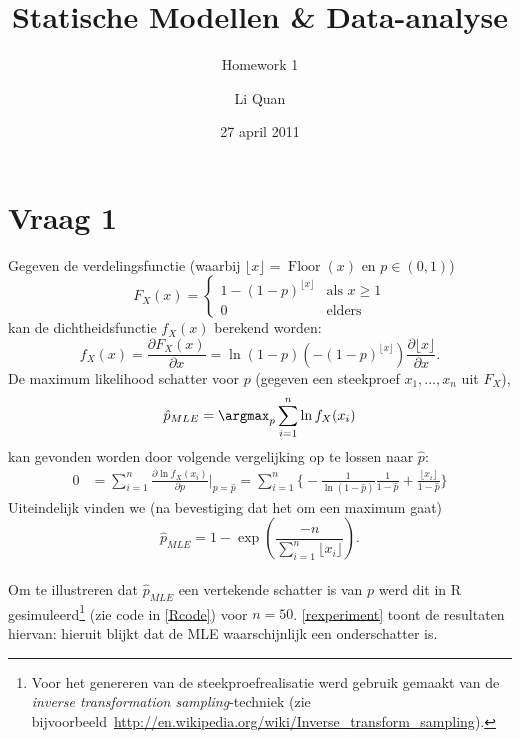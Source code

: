 \documentclass[a4paper,dutch,11pt,]{scrartcl}
\title{Statische Modellen \& Data-analyse}
\subtitle{Homework 1}
\author{Li Quan}
\date{27 april 2011}
\DeclareMathOperator{\floor}{Floor}
\begin{document}
\maketitle





\section*{Vraag 1}
\label{vraag1}
Gegeven de verdelingsfunctie (waarbij $\lfloor {x} \rfloor= \floor{(x)}$ en $p\in (0,1)$)
\[
 F_X(x) =
  \begin{cases}
   1 - (1-p)^{\lfloor {x} \rfloor} & \text{als } x \geq 1 \\
   0       & \text{elders }
  \end{cases}
\]
kan de dichtheidsfunctie $f_X(x)$ berekend worden:
\begin{equation*}
 f_X(x)= \frac{\partial F_X(x)}{\partial x} = \ln{(1-p)} (-(1-p)^{\lfloor {x} \rfloor}) \frac{\partial {\lfloor {x} \rfloor}}{\partial x}.
\end{equation*}
De maximum likelihood schatter voor $p$ (gegeven een steekproef $x_1,\ldots,x_n$ uit $F_X$), \[ \hat{p}_{MLE}=\argmax_{p} \displaystyle\sum\limits_{i=1}^n \ln{f_X(x_i)} \]
kan gevonden worden door volgende vergelijking op te lossen naar $\hat{p}$:
\begin{align*}
 0 &= \sum\limits_{i=1}^n  \frac{\partial \ln{f_X(x_i)}} {\partial p}\Big |_{p=\hat{p}} = \sum\limits_{i=1}^n \Big\{
      -\frac{1}{\ln{(1-\hat{p})}} \frac{1}{1-\hat{p}}  
      + \frac{ \lfloor{x_i} \rfloor} {1-\hat{p}} \Big\}
\end{align*}
Uiteindelijk vinden we (na bevestiging dat het om een maximum gaat) \[ \hat{p}_{MLE} = 1 - \exp (\frac{-n}{ \sum\limits_{i=1}^n  { \lfloor{x_i} \rfloor } } ). \] 

\paragraph{}
Om te illustreren dat $\hat{p}_{MLE}$ een vertekende schatter is van $p$ werd dit in R gesimuleerd\footnote{Voor het genereren van de steekproefrealisatie werd gebruik gemaakt van de \emph{inverse transformation sampling}-techniek (zie bijvoorbeeld~\url{http://en.wikipedia.org/wiki/Inverse_transform_sampling}).} (zie code in \autoref{Rcode}) voor $n=50$. \autoref{rexperiment} toont de resultaten hiervan: hieruit blijkt dat de MLE waarschijnlijk een onderschatter is.
\end{document}
